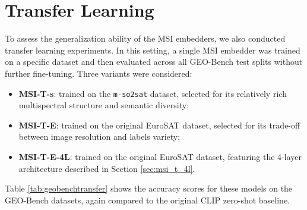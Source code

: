 \documentclass[a4paper, oneside, english]{sapthesis} %
\begin{document}
\section{Transfer Learning}

To assess the generalization ability of the MSI embedders, we also conducted transfer learning experiments. In this setting, a single MSI embedder was trained on a specific dataset and then evaluated across all GEO-Bench test splits without further fine-tuning. Three variants were considered:

\begin{itemize}
    \item \textbf{MSI-T-s}: trained on the \texttt{m-so2sat} dataset, selected for its relatively rich multispectral structure and semantic diversity;
    \item \textbf{MSI-T-E}: trained on the original EuroSAT dataset, selected for its trade-off between image resolution and labels variety;
    \item \textbf{MSI-T-E-4L}: trained on the original EuroSAT dataset, featuring the 4-layer architecture described in Section \ref{sec:msi_t_4l}.
\end{itemize}

Table \ref{tab:geobenchtransfer} shows the accuracy scores for these models on the GEO-Bench datasets, again compared to the original CLIP zero-shot baseline.
\end{document}
